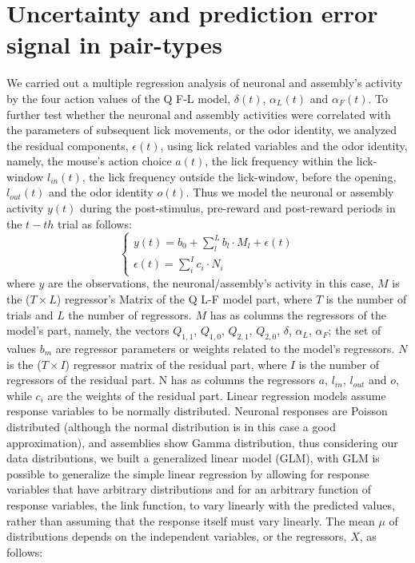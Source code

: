 \section{Uncertainty and prediction error signal in pair-types}
\label{sec:CorrRL}
We carried out a multiple regression analysis of neuronal and assembly's activity by the four action values of the Q F-L model, $\delta(t)$, $\alpha_L(t)$ and $\alpha_F(t)$. To further test whether the neuronal and assembly activities were correlated with the parameters of subsequent lick movements, or the odor identity, we analyzed the residual components, $\epsilon(t)$, using lick related variables and the odor identity, namely, the mouse's action choice $a(t)$, the lick frequency within the lick-window $l_{in}(t)$, the lick frequency outside the lick-window, before the opening,$l_{out}(t)$ and the odor identity $o(t)$.
Thus we model the neuronal or assembly activity $y(t)$ during the post-stimulus, pre-reward and post-reward periods in the $t-th$ trial as follows:\\
\begin{equation}
\begin{cases}
y(t)=b_0+\sum\limits_{l}^{L} b_l\cdot M_l+\epsilon(t)\\
\epsilon(t)=\sum\limits_i^I c_i\cdot N_i
\end{cases}
\label{eq:MultiLinRe}
\end{equation}
where $y$ are the observations, the neuronal{\color{blue}/assembly's} activity in this case, $M$ is the ($T\times L$) regressor's Matrix of the Q L-F model part, where $T$ is the number of trials and $L$ the number of regressors. $M$ has as columns
the regressors of the model's part, namely, the vectors $Q_{1,1}$, $Q_{1,0}$, $Q_{2,1}$, $Q_{2,0}$, $\delta$, $\alpha_L$, $\alpha_F$; the set of values $b_m$ are regressor parameters or weights related to the model's regressors. $N$ is the ($T\times I$) regressor matrix of the residual part, where $I$ is the number of regressors of the residual part. N has as columns the regressors $a$, $l_{in}$, $l_{out}$ and $o$, while $c_i$ are the weights of the residual part.
Linear regression models assume response variables to be normally distributed. Neuronal responses are Poisson distributed (although the normal distribution is in this case a good approximation), {\color{blue} and assemblies show Gamma distribution,} thus considering our data distributions, we built a generalized linear model (GLM), with GLM is possible to generalize the simple linear regression by allowing for response variables that have arbitrary distributions and for an arbitrary function of response variables, the link function, to vary linearly with the predicted values, rather than assuming that the response itself must vary linearly. The mean $\mu$ of distributions depends on the independent variables, or the regressors, $X$, as follows:
